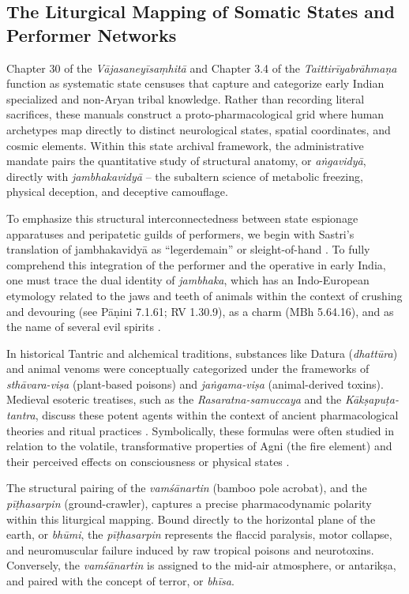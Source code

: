 \documentclass[11pt,twoside,letterpaper]{article}
\begin{document}
\subsection{The Liturgical Mapping of Somatic States and Performer Networks}
Chapter 30 of the \textit{Vājasaneyīsaṃhitā} and Chapter 3.4 of the \textit{Taittirīyabrāhmaṇa} function as systematic state censuses that capture and categorize early Indian specialized and non-Aryan tribal knowledge. Rather than recording literal sacrifices, these manuals construct a proto-pharmacological grid where human archetypes map directly to distinct neurological states, spatial coordinates, and cosmic elements. Within this state archival framework, the administrative mandate pairs the quantitative study of structural anatomy, or \textit{aṅgavidyā}, directly with \textit{jambhakavidyā} -- the subaltern science of metabolic freezing, physical deception, and deceptive camouflage. 

To emphasize this structural interconnectedness between state espionage apparatuses and peripatetic guilds of performers, we begin with Sastri's translation of jambhakavidyā as ``legerdemain'' or sleight-of-hand \citep{shamasastri1929}. To fully comprehend this integration of the performer and the operative in early India, one must trace the dual identity of \textit{jambhaka}, which has an Indo-European etymology related to the jaws and teeth of animals within the context of crushing and devouring (see Pāṇini 7.1.61; RV 1.30.9), as a charm (MBh 5.64.16), and as the name of several evil spirits \citep{narten1965}. 

In historical Tantric and alchemical traditions, substances like Datura (\textit{dhattūra}) and animal venoms were conceptually categorized under the frameworks of \textit{sthāvara-viṣa} (plant-based poisons) and \textit{jaṅgama-viṣa} (animal-derived toxins). Medieval esoteric treatises, such as the \textit{Rasaratna-samuccaya} and the \textit{Kākṣapuṭa-tantra}, discuss these potent agents within the context of ancient pharmacological theories and ritual practices \citep{wujastyk2003roots, white1996alchemical}. Symbolically, these formulas were often studied in relation to the volatile, transformative properties of Agni (the fire element) and their perceived effects on consciousness or physical states \citep{svoboda1993aghora}.

The structural pairing of the \textit{vamśānartin} (bamboo pole acrobat), and the \textit{pīṭhasarpin} (ground-crawler), captures a precise pharmacodynamic polarity within this liturgical mapping. Bound directly to the horizontal plane of the earth, or \textit{bhūmi}, the \textit{pīṭhasarpin} represents the flaccid paralysis, motor collapse, and neuromuscular failure induced by raw tropical poisons and neurotoxins. Conversely, the \textit{vamśānartin} is assigned to the mid-air atmosphere, or antarikṣa, and paired with the concept of terror, or \textit{bhīsa}. 
\end{document}
